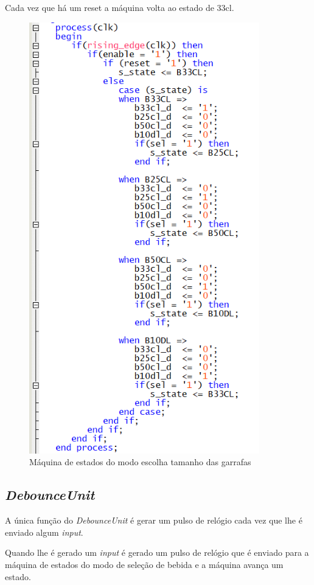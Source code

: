 \documentclass{report}
\begin{document}
Cada vez que há um reset a máquina volta ao estado de 33cl.

\begin{figure}[H]
    \centering
    \includegraphics[width = 10cm]{SelFSM.png}
    \caption{Máquina de estados do modo escolha tamanho das garrafas }
    \label{fig:MEGFSM}
\end{figure}

\subsection{\textit{DebounceUnit}}

A única função do \textit{DebounceUnit} é gerar um pulso de relógio cada vez que lhe é enviado algum \textit{input}.

Quando lhe é gerado um \textit{input} é gerado um pulso de relógio que é enviado para a máquina de estados do modo de seleção de bebida e a máquina avança um estado.
\end{document}
